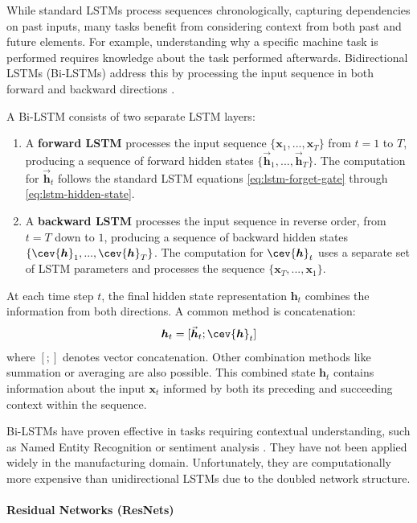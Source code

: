 While standard LSTMs process sequences chronologically, capturing dependencies on past inputs, many tasks benefit from considering context from both past and future elements. For example, understanding why a specific machine task is performed requires knowledge about the task performed afterwards. Bidirectional LSTMs (Bi-LSTMs) address this by processing the input sequence in both forward and backward directions \autocite{schuster1997bidirectional}.

A Bi-LSTM consists of two separate LSTM layers:

\begin{enumerate}
  \item A \textbf{forward LSTM} processes the input sequence \( \{\bm{x}_1, ..., \bm{x}_T\} \) from \( t=1 \) to \( T \), producing a sequence of forward hidden states \( \{\vec{\bm{h}}_1, ..., \vec{\bm{h}}_T\} \). The computation for \( \vec{\bm{h}}_t \) follows the standard LSTM equations \autoref{eq:lstm-forget-gate} through \autoref{eq:lstm-hidden-state}.
  \item A \textbf{backward LSTM} processes the input sequence in reverse order, from \( t=T \) down to \( 1 \), producing a sequence of backward hidden states \( \{\cev{\bm{h}}_1, ..., \cev{\bm{h}}_T\} \). The computation for \( \cev{\bm{h}}_t \) uses a separate set of LSTM parameters and processes the sequence \( \{\bm{x}_T, ..., \bm{x}_1\} \).
\end{enumerate}

At each time step \( t \), the final hidden state representation \( \bm{h}_t \) combines the information from both directions. A common method is concatenation:
\begin{equation}
  \bm{h}_t = [\vec{\bm{h}}_t ; \cev{\bm{h}}_t]
  \label{eq:bilstm_concat}
\end{equation}
where \( [;] \) denotes vector concatenation. Other combination methods like summation or averaging are also possible. This combined state \( \bm{h}_t \) contains information about the input \( \bm{x}_t \) informed by both its preceding and succeeding context within the sequence.

Bi-LSTMs have proven effective in tasks requiring contextual understanding, such as Named Entity Recognition or sentiment analysis \autocite{al2024rnn}. They have not been applied widely in the manufacturing domain. Unfortunately, they are computationally more expensive than unidirectional LSTMs due to the doubled network structure.

\paragraph{\textbf{Residual Networks (ResNets)}}
\label{sec:resnet}

